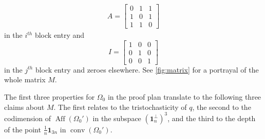 \documentclass[10pt,a4paper]{article}
\numberwithin{equation}{section}
\DeclareMathOperator{\aff}{Aff}
\DeclareMathOperator{\conv}{conv}
\newcommand{\id}{\mathbf{1}}
\begin{document}
\begin{gather}A = \begin{bmatrix} 0 & 1 & 1 \\ 1 & 0 & 1 \\ 1 & 1 & 0 \end{bmatrix} \label{eq:a-matrix}\end{gather}
 in the $i^{th}$ block entry and 
 $$ I = \begin{bmatrix} 1 & 0 & 0 \\ 0 & 1 & 0 \\ 0 & 0 & 1 \end{bmatrix} $$ in the $j^{th}$ block entry and zeroes elsewhere. See \cref{fig:matrix} for a portrayal of the whole matrix $M$.
 
 
The first three properties for $\Omega_0$ in the proof plan translate to the following three claims about $M$. The first relates to the tristochasticity of $q$, the second to the codimension of $\aff(\Omega_0')$ in the subspace $(\id_n^\perp)^3$, and the third to the depth of the point $\frac{1}{n}\id_{3n}$ in $\conv(\Omega_0')$. 
 
\end{document}
